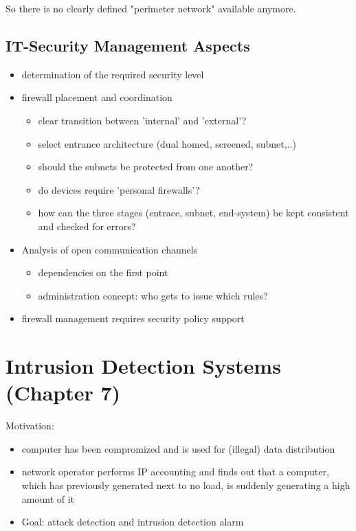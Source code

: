 \documentclass[11pt]{article}
\begin{document}
So there is no clearly defined "perimeter network" available anymore.

\subsection{IT-Security Management Aspects}
\label{sec:orga35ccd0}
\begin{itemize}
\item determination of the required security level
\item firewall placement and coordination
\begin{itemize}
\item clear transition between 'internal' and 'external'?
\item select entrance architecture (dual homed, screened, subnet,..)
\item should the subnets be protected from one another?
\item do devices require 'personal firewalls'?
\item how can the three stages (entrace, subnet, end-system) be kept consistent and checked for errors?
\end{itemize}
\item Analysis of open communication channels
\begin{itemize}
\item dependencies on the first point
\item administration concept: who gets to issue which rules?
\end{itemize}
\item firewall management requires security policy support
\end{itemize}

\section{Intrusion Detection Systems (Chapter 7)}
\label{sec:org34d5c4f}
Motivation:
\begin{itemize}
\item computer has been compromized and is used for (illegal) data distribution
\item network operator performs IP accounting and finds out that a computer, which has previously generated next to no load, is suddenly generating a high amount of it
\item Goal: attack detection and intrusion detection alarm
\end{itemize}
\end{document}
